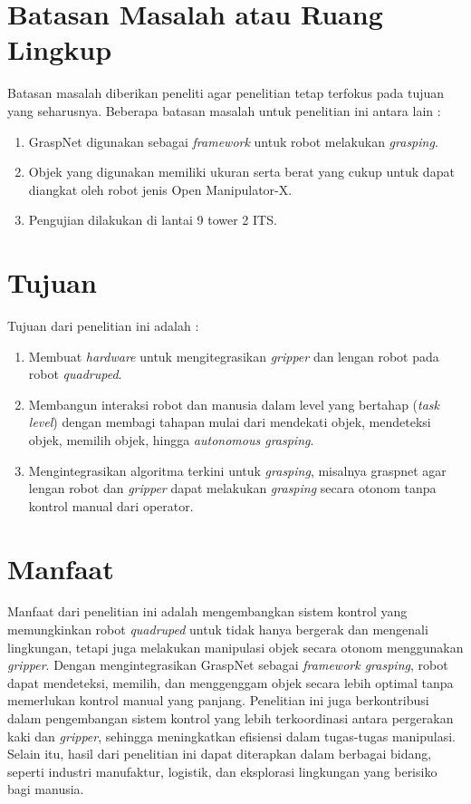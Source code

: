 \section{Batasan Masalah atau Ruang Lingkup}

Batasan masalah diberikan peneliti agar penelitian tetap terfokus pada tujuan yang seharusnya. Beberapa batasan masalah untuk penelitian ini antara lain :

\begin{enumerate}
    \item GraspNet digunakan sebagai \emph{framework} untuk robot melakukan \emph{grasping}.
    \item Objek yang digunakan memiliki ukuran serta berat yang cukup untuk dapat diangkat oleh robot jenis Open Manipulator-X.
    \item Pengujian dilakukan di lantai 9 tower 2 ITS.
\end{enumerate}

\section{Tujuan}

Tujuan dari penelitian ini adalah :

\begin{enumerate}
    \item Membuat \emph{hardware} untuk mengitegrasikan \emph{gripper} dan lengan robot pada robot \emph{quadruped}.
    \item Membangun interaksi robot dan manusia dalam level yang bertahap (\emph{task level})
    dengan membagi tahapan mulai dari mendekati objek, mendeteksi objek, memilih objek, hingga \emph{autonomous grasping}.
    \item Mengintegrasikan algoritma terkini untuk \emph{grasping}, misalnya graspnet agar
    lengan robot dan \emph{gripper} dapat melakukan \emph{grasping} secara otonom tanpa kontrol manual dari operator.
\end{enumerate}

\section{Manfaat}

Manfaat dari penelitian ini adalah mengembangkan sistem kontrol yang memungkinkan
robot \emph{quadruped} untuk tidak hanya bergerak dan mengenali lingkungan,
tetapi juga melakukan manipulasi objek secara otonom menggunakan \emph{gripper}.
Dengan mengintegrasikan GraspNet sebagai \emph{framework grasping}, robot dapat mendeteksi,
memilih, dan menggenggam objek secara lebih optimal tanpa memerlukan kontrol manual yang panjang.
Penelitian ini juga berkontribusi dalam pengembangan sistem kontrol yang lebih terkoordinasi
antara pergerakan kaki dan \emph{gripper}, sehingga meningkatkan efisiensi dalam tugas-tugas manipulasi.
Selain itu, hasil dari penelitian ini dapat diterapkan dalam berbagai bidang,
seperti industri manufaktur, logistik, dan eksplorasi lingkungan yang berisiko bagi manusia.